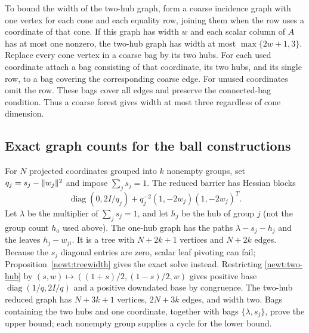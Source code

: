 To bound the width of the two-hub graph, form a coarse incidence graph
with one vertex for each cone and each equality row, joining them when the row uses a
coordinate of that cone.  If this graph has width $w$ and each scalar
column of $A$ has at most one nonzero, the two-hub graph has width at
most $\max\{2w+1,3\}$.  Replace every cone vertex in a coarse bag by its
two hubs.  For each used coordinate attach a bag consisting of that
coordinate, its two hubs, and its single row, to a bag covering the
corresponding coarse edge.  For unused coordinates omit the row.  These
bags cover all edges and preserve the connected-bag condition.  Thus a
coarse forest gives width at most three regardless of cone dimension.

\subsection{Exact graph counts for the ball constructions}

For $N$ projected coordinates grouped into $k$ nonempty groups, set
$q_j=s_j-\lVert w_j\rVert^2$ and impose $\sum_j s_j=1$.
The reduced barrier has Hessian blocks
\begin{equation}\label{newt:group-hessian}
 \operatorname{diag}(0,2I/q_j)
      +q_j^{-2}(1,-2w_j)(1,-2w_j)^T.
\end{equation}
Let $\lambda$ be the multiplier of $\sum_j s_j=1$, and let $h_j$ be the
hub of group $j$ (not the group count $h_a$ used above).  The one-hub
graph has the paths $\lambda-s_j-h_j$ and the leaves $h_j-w_{ji}$.
It is a tree with $N+2k+1$ vertices and $N+2k$ edges.
Because the $s_j$ diagonal entries are zero, scalar leaf pivoting can
fail;
Proposition~\ref{newt:treewidth} gives the exact solve instead.
Restricting \eqref{newt:two-hub} by
$(s,w)\mapsto((1+s)/2,(1-s)/2,w)$ gives positive base
$\operatorname{diag}(1/q,2I/q)$ and a positive downdated base by
congruence.  The two-hub reduced graph has $N+3k+1$ vertices,
$2N+3k$ edges, and width two.  Bags containing the two hubs and one
coordinate, together with bags $\{\lambda,s_j\}$, prove the upper
bound; each nonempty group supplies a cycle for the lower bound.

